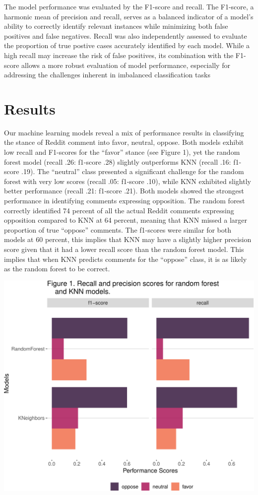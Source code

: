 \documentclass[
  12pt]{article}
\begin{document}
The model performance was evaluated by the F1-score and recall. The
F1-score, a harmonic mean of precision and recall, serves as a balanced
indicator of a model's ability to correctly identify relevant instances
while minimizing both false positives and false negatives. Recall was
also independently assessed to evaluate the proportion of true postive
cases accurately identified by each model. While a high recall may
increase the risk of false positives, its combination with the F1-score
allows a more robust evaluation of model performance, especially for
addressing the challenges inherent in imbalanced classification tasks

\section{Results}\label{results}

Our machine learning models reveal a mix of performance results in
classifying the stance of Reddit comment into favor, neutral, oppose.
Both models exhibit low recall and F1-scores for the ``favor'' stance
(see Figure 1), yet the random forest model (recall .26: f1-score .28)
slightly outperforms KNN (recall .16: f1-score .19). The ``neutral''
class presented a significant challenge for the random forest with very
low scores (recall .05: f1-score .10), while KNN exhibited slightly
better performance (recall .21: f1-score .21). Both models showed the
strongest performance in identifying comments expressing opposition. The
random forest correctly identified 74 percent of all the actual Reddit
comments expressing opposition compared to KNN at 64 percent, meaning
that KNN missed a larger proportion of true ``oppose'' comments. The
f1-scores were similar for both models at 60 percent, this implies that
KNN may have a slightly higher precision score given that it had a lower
recall score than the random forest model. This implies that when KNN
predicts comments for the ``oppose'' class, it is as likely as the
random forest to be correct.

\includegraphics{assign_3_files/figure-pdf/unnamed-chunk-3-1.pdf}
\end{document}
